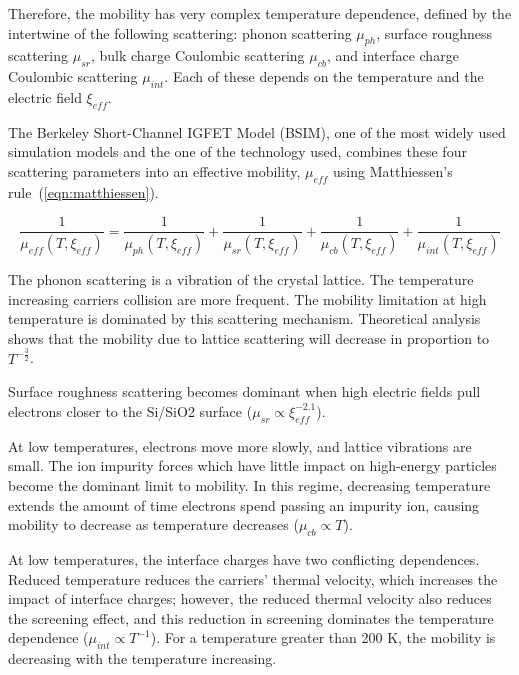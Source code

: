 Therefore, the mobility has very complex temperature dependence, defined by the intertwine of the following scattering: phonon scattering \(\mu_{ph} \), surface roughness scattering \(\mu_{sr} \), bulk charge Coulombic scattering \(\mu_{cb} \), and interface charge Coulombic scattering \(\mu_{int} \). Each of these depends on the temperature and the electric field \(\xi_{eff} \).

The Berkeley Short-Channel IGFET Model (BSIM), one of the most widely used simulation models and the one of the technology used, combines these four scattering parameters into an effective mobility, \( \mu_{eff} \) using Matthiessen’s rule~(\ref{eqn:matthiessen}).

\begin{equation}
\label{eqn:matthiessen}
\frac{1}{\mu_{eff}(T, \xi_{eff})} = \frac{1}{\mu_{ph}(T, \xi_{eff})} +
\frac{1}{\mu_{sr}(T, \xi_{eff})} + \frac{1}{\mu_{cb}(T, \xi_{eff})} + 
\frac{1}{\mu_{int}(T, \xi_{eff})}
\end{equation}

The phonon scattering is a vibration of the crystal lattice. The temperature increasing carriers collision are more frequent. The mobility limitation at high temperature is dominated by this scattering mechanism. Theoretical analysis shows that the mobility due to lattice scattering will decrease in proportion to \(T^{-\frac{3}{2}} \).

Surface roughness scattering becomes dominant when high electric fields pull electrons closer to the Si/SiO2 surface (\(\mu_{sr} \varpropto \xi_{eff}^{-2.1} \))\cite{KLee1991}.

At low temperatures, electrons move more slowly, and lattice vibrations are
small. The ion impurity forces which have little impact on high-energy
particles become the dominant limit to mobility. In this regime, decreasing temperature extends the amount of time electrons spend passing an impurity ion, causing mobility to decrease as temperature decreases (\(\mu_{cb} \varpropto T \)).

At low temperatures, the interface charges have two conflicting dependences. Reduced temperature reduces the carriers’ thermal velocity, which increases the impact of interface charges; however, the reduced thermal velocity also reduces the screening effect\cite{Jeon1989}, and this reduction in screening dominates the temperature dependence (\(\mu_{int} \varpropto T^{-1} \)). For a temperature greater than 200 K, the mobility is decreasing with the temperature increasing.

